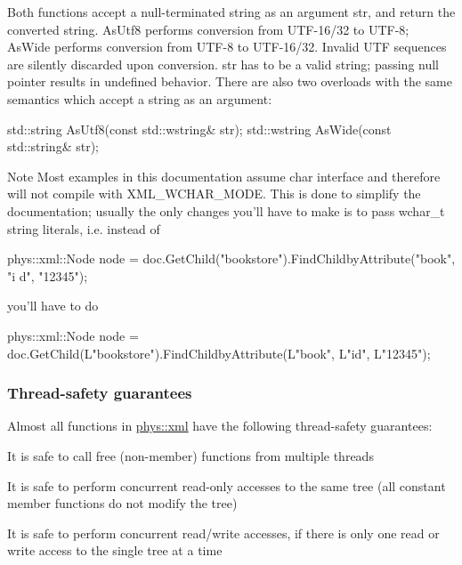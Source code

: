  Both functions accept a null-\/terminated string as an argument str, and return the converted string. AsUtf8 performs conversion from UTF-\/16/32 to UTF-\/8; AsWide performs conversion from UTF-\/8 to UTF-\/16/32. Invalid UTF sequences are silently discarded upon conversion. str has to be a valid string; passing null pointer results in undefined behavior. There are also two overloads with the same semantics which accept a string as an argument: 
\begin{DoxyCode}
 std::string AsUtf8(const std::wstring& str);
 std::wstring AsWide(const std::string& str);
\end{DoxyCode}
 \begin{DoxyNote}{Note}
Most examples in this documentation assume char interface and therefore will not compile with XML\_\-WCHAR\_\-MODE. This is done to simplify the documentation; usually the only changes you'll have to make is to pass wchar\_\-t string literals, i.e. instead of \par
 \par
 
\begin{DoxyCode}
 phys::xml::Node node = doc.GetChild("bookstore").FindChildbyAttribute("book", "i
      d", "12345"); 
\end{DoxyCode}
 \par
 \par
 you'll have to do \par
 \par
 
\begin{DoxyCode}
 phys::xml::Node node = doc.GetChild(L"bookstore").FindChildbyAttribute(L"book", 
      L"id", L"12345"); 
\end{DoxyCode}
 \par
 \par
 
\end{DoxyNote}
\hypertarget{XMLManual_XMLThreadSafety}{}\subsubsection{Thread-\/safety guarantees}\label{XMLManual_XMLThreadSafety}
Almost all functions in \hyperlink{namespacephys_1_1xml}{phys::xml} have the following thread-\/safety guarantees:
\begin{DoxyItemize}
\item It is safe to call free (non-\/member) functions from multiple threads
\item It is safe to perform concurrent read-\/only accesses to the same tree (all constant member functions do not modify the tree)
\item It is safe to perform concurrent read/write accesses, if there is only one read or write access to the single tree at a time
\end{DoxyItemize}


